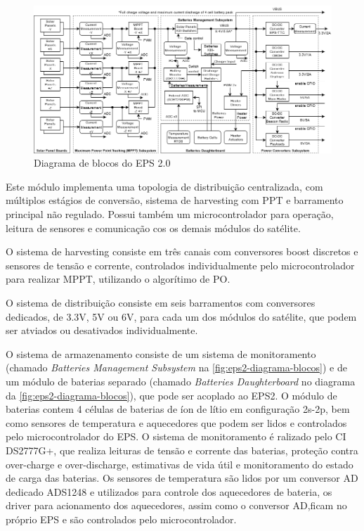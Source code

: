 \begin{figure}[htp]
    \caption{Diagrama de blocos do EPS 2.0}
    \begin{center}
        \includegraphics[width=\textwidth, keepaspectratio]{images/eps2-power-diagram.png}
    \end{center}
    \label{fig:eps2-diagrama-blocos}
\end{figure}

Este módulo implementa uma topologia de distribuição centralizada, com múltiplos estágios de conversão, sistema de harvesting com \gls{PPT} e barramento principal não regulado.
Possui também um microcontrolador para operação, leitura de sensores e comunicação cos os demais módulos do satélite.

O sistema de harvesting consiste em três canais com conversores boost discretos e sensores de tensão e corrente, controlados individualmente pelo microcontrolador para realizar \gls{MPPT}, utilizando o algorítimo de \gls{PO}.

O sistema de distribuição consiste em seis barramentos com conversores dedicados, de 3.3V, 5V ou 6V, para cada um dos módulos do satélite, que podem ser atviados ou desativados individualmente.

O sistema de armazenamento consiste de um sistema de monitoramento (chamado \textit{Batteries Management Subsystem} na \autoref{fig:eps2-diagrama-blocos}) e de um módulo de baterias separado (chamado \textit{Batteries Daughterboard} no diagrama da \autoref{fig:eps2-diagrama-blocos}), que pode ser acoplado ao \gls{EPS2}.
O módulo de baterias contem 4 células de baterias de íon de lítio em configuração 2s-2p, bem como sensores de temperatura e aquecedores que podem ser lidos e controlados pelo microcontrolador do \gls{EPS}.
O sistema de monitoramento é ralizado pelo CI DS2777G+, que realiza leituras de tensão e corrente das baterias, proteção contra over-charge e over-discharge, estimativas de vida útil e monitoramento do estado de carga das baterias.
Os sensores de temperatura são lidos por um conversor AD dedicado ADS1248 e utilizados para controle dos aquecedores de bateria, os driver para acionamento dos aquecedores, assim como o conversor AD,ficam no próprio \gls{EPS} e são controlados pelo microcontrolador.

